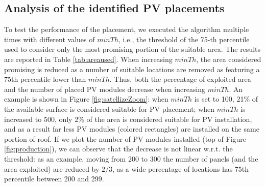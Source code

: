\subsection{Analysis of the identified PV placements}
To test the performance of the placement, we executed the algorithm multiple times with different values of $minTh$, i.e., the threshold of the 75-th percentile used to consider only the most promising portion of the suitable area. The results are reported in Table \ref{tab:areaused}. When increasing $minTh$, the area considered promising is reduced as a number of suitable locations are removed as featuring a 75th percentile lower than $minTh$. Thus, both the percentage of exploited area and the number of placed PV modules decrease when increasing $minTh$. 
An example is shown in Figure \ref{fig:satellizeZoom}: when $minTh$ is set to 100, 21\% of the available surface is considered suitable for PV placement; when $minTh$ is increased to 500, only 2\% of the area is considered suitable for PV installation, and as a result far less PV modules (colored rectangles) are installed on the same portion of roof. %
If we plot the number of PV modules installed (top of Figure \ref{fig:production}), we can observe that the decrease is not linear w.r.t. the threshold: as an example, moving from 200 to 300 the number of panels (and the area exploited) are reduced by $2/3$, as a wide percentage of locations has 75th percentile between 200 and 299. %
